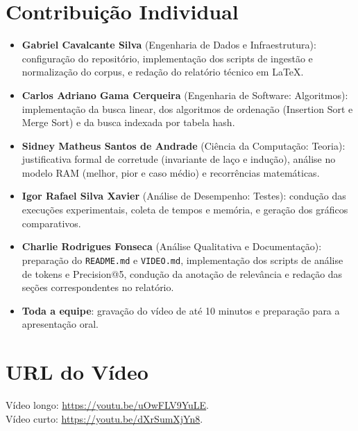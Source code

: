 \documentclass[12pt, a4paper]{article}
\begin{document}
\section{Contribuição Individual}
\begin{itemize}
    \item \textbf{Gabriel Cavalcante Silva} (Engenharia de Dados e Infraestrutura): configuração do repositório, implementação dos scripts de ingestão e normalização do corpus, e redação do relatório técnico em LaTeX.
    \item \textbf{Carlos Adriano Gama Cerqueira} (Engenharia de Software: Algoritmos): implementação da busca linear, dos algoritmos de ordenação (Insertion Sort e Merge Sort) e da busca indexada por tabela hash.
    \item \textbf{Sidney Matheus Santos de Andrade} (Ciência da Computação: Teoria): justificativa formal de corretude (invariante de laço e indução), análise no modelo RAM (melhor, pior e caso médio) e recorrências matemáticas.
    \item \textbf{Igor Rafael Silva Xavier} (Análise de Desempenho: Testes): condução das execuções experimentais, coleta de tempos e memória, e geração dos gráficos comparativos.
    \item \textbf{Charlie Rodrigues Fonseca} (Análise Qualitativa e Documentação): preparação do \texttt{README.md} e \texttt{VIDEO.md}, implementação dos scripts de análise de tokens e Precision@5, condução da anotação de relevância e redação das seções correspondentes no relatório.
    \item \textbf{Toda a equipe}: gravação do vídeo de até 10 minutos e preparação para a apresentação oral.
\end{itemize}

\section{URL do Vídeo}

Vídeo longo: \url{https://youtu.be/uOwFLV9YuLE}.\\
Vídeo curto: \url{https://youtu.be/dXrSumXjYn8}.
\end{document}

